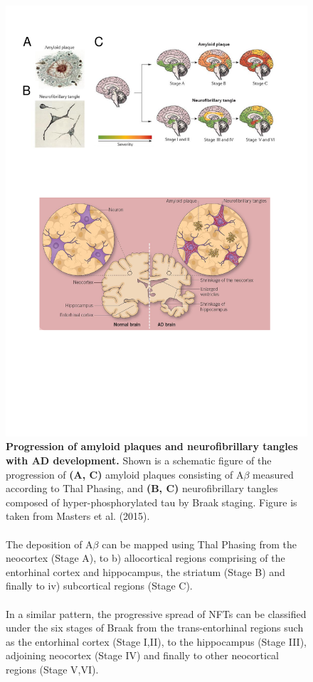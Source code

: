 \begin{figure}[!htp]
	\centering
	\includegraphics[page=1,trim={0 19cm 0cm 0cm},clip, scale = 0.8]{Figures/Introduction_Figures.pdf}
	\captionsetup{width=0.95\textwidth,singlelinecheck=off}
	\caption[Progression of amyloid plaques and neurofibrillary tangles with AD development]%
	{\textbf{Progression of amyloid plaques and neurofibrillary tangles with AD development.} Shown is a schematic figure of the progression of \textbf{(A, C)} amyloid plaques consisting of A$\beta$ measured according to Thal Phasing\cite{DR2002}, and \textbf{(B, C)} neurofibrillary tangles composed of hyper-phosphorylated tau by Braak staging\cite{H1991}. Figure is taken from Masters et al. (2015)\cite{Masters2015}. 
	\\
	\\ 
	The deposition of A$\beta$ can be mapped using Thal Phasing from the neocortex (Stage A), to b) allocortical regions comprising of the entorhinal cortex and hippocampus, the striatum (Stage B) and finally to iv) subcortical regions (Stage C)\cite{DR2002}. 
	\\
	\\
	In a similar pattern, the progressive spread of NFTs can be classified under the six stages of Braak from the trans-entorhinal regions such as the entorhinal cortex (Stage I,II), to the hippocampus (Stage III), adjoining neocortex (Stage IV) and finally to other neocortical regions (Stage V,VI)\cite{H1991}. 	
	}
	\label{fig:AD_development}
\end{figure}


